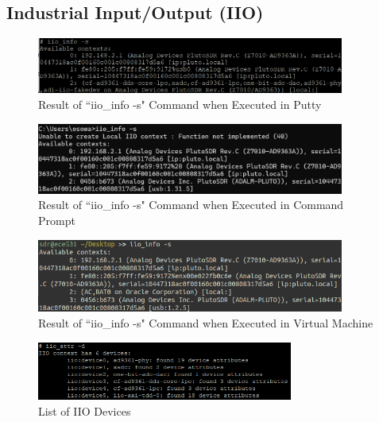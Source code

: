 \documentclass{article}
\begin{document}
\subsection{Industrial Input/Output (IIO)}

\begin{figure}[H]
	\centerline{\includegraphics[width=0.9\textwidth]{iio_info_putty.png}}
	\caption{Result of ``iio\_info -s" Command when Executed in Putty}
	\label{fig::iio_info_putty}
\end{figure}

\begin{figure}[H]
	\centerline{\includegraphics[width=0.9\textwidth]{iio_info_cmd.png}}
	\caption{Result of ``iio\_info -s" Command when Executed in Command Prompt}
	\label{fig::iio_info_cmd}
\end{figure}

\begin{figure}[H]
	\centerline{\includegraphics[width=0.9\textwidth]{iio_info_vm.png}}
	\caption{Result of ``iio\_info -s" Command when Executed in Virtual Machine}
	\label{fig::iio_info_vm}
\end{figure}

\begin{figure}[H]
	\centerline{\includegraphics[width=0.75\textwidth]{iio_devices.png}}
	\caption{List of IIO Devices}
	\label{fig::iio_devices}
\end{figure}
\end{document}
